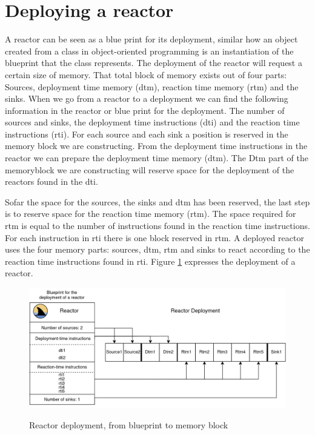 \documentclass[a4paper]{book}
\begin{document}
\section{Deploying a reactor}
A reactor can be seen as a blue print for its deployment, similar how an object created from a class in object-oriented programming is an instantiation of the blueprint that the class represents. The deployment of the reactor will request a certain size of memory. That total block of memory exists out of four parts: Sources, deployment time memory (dtm), reaction time memory (rtm) and the sinks. When we go from a reactor to a deployment we can find the following information in the reactor or blue print for the deployment. The number of sources and sinks, the deployment time instructions (dti) and the reaction time instructions (rti). For each source and each sink a position is reserved in the memory block we are constructing. From the deployment time instructions in the reactor we can prepare the deployment time memory (dtm). The Dtm part of the memoryblock we are constructing will reserve space for the deployment of the reactors found in the dti. 

Sofar the space for the sources, the sinks and dtm has been reserved, the last step is to reserve space for the reaction time memory (rtm). The space required for rtm is equal to the number of instructions found in the reaction time instructions. For each instruction in rti there is one block reserved in rtm. A deployed reactor uses the four memory parts: sources, dtm, rtm and sinks to react according to the reaction time instructions found in rti. Figure \ref{fig:rde} expresses the deployment of a reactor.

\begin{figure}[h]
	\caption{Reactor deployment, from blueprint to memory block}
	\includegraphics[width=\textwidth]{rd.drawio}
	\label{fig:rde}
\end{figure} 
\end{document}
